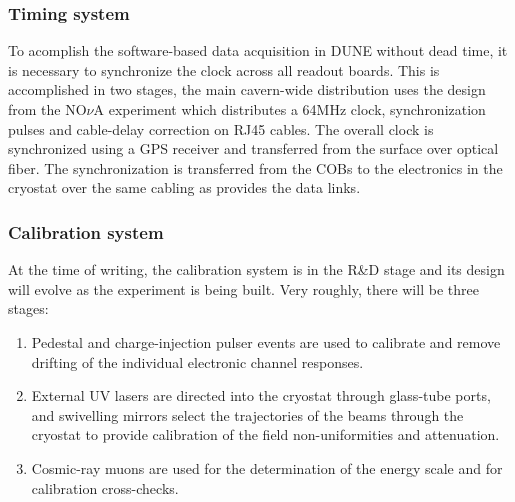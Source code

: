 \subsubsection{Timing system}
To acomplish the software-based data acquisition in DUNE without dead time, it is
necessary to synchronize the clock across all readout boards.  This is accomplished
in two stages, the main cavern-wide distribution uses the design from the NO$\nu$A
experiment which distributes a 64MHz clock, synchronization pulses and
cable-delay correction on RJ45 cables.  The overall clock is
synchronized using a GPS receiver and transferred from the surface
over optical fiber.  The synchronization is transferred from the COBs
to the electronics in the cryostat over the same cabling as provides
the data links.

\subsubsection{Calibration system}
\label{sec:daq-calibrations}

At the time of writing, the calibration system is in the R\&D stage and its design will
evolve as the experiment is being built. Very roughly, there will be three stages:
\begin{enumerate}

\item Pedestal and charge-injection pulser events are used to calibrate and
remove drifting of the individual electronic channel responses.

\item External UV lasers are directed into the cryostat through glass-tube
ports, and swivelling mirrors select the trajectories of the beams
through the cryostat to provide calibration of the field
non-uniformities and attenuation.

\item Cosmic-ray muons are used for the determination of the energy scale and for calibration
cross-checks.

\end{enumerate}



